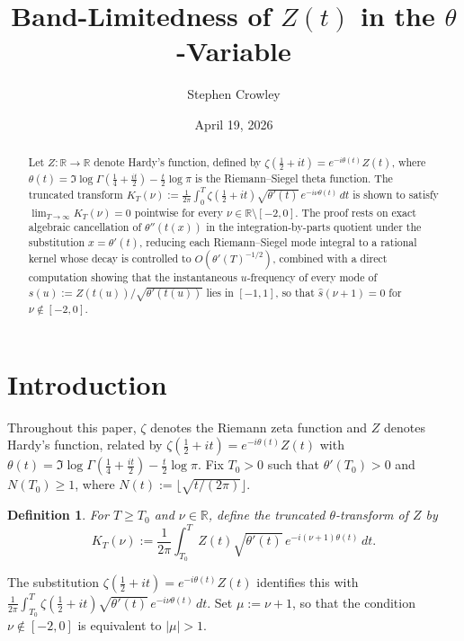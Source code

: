\documentclass[12pt]{article}
\title{Band-Limitedness of $Z(t)$ in the $\theta$-Variable}
\author{Stephen Crowley}
\date{April 19, 2026}
\newtheorem{definition}{Definition}
\begin{document}
\maketitle

\begin{abstract}
Let $Z:\mathbb{R}\to\mathbb{R}$ denote Hardy's function, defined by $\zeta(\tfrac{1}{2}+it) = e^{-i\theta(t)}Z(t)$, where $\theta(t) = \Im\log\Gamma\!\left(\tfrac{1}{4}+\tfrac{it}{2}\right) - \tfrac{t}{2}\log\pi$ is the Riemann--Siegel theta function. The truncated transform $K_T(\nu) := \frac{1}{2\pi}\int_{0}^{T}\zeta(\tfrac{1}{2}+it)\sqrt{\theta'(t)}\,e^{-i\nu\theta(t)}\,dt$ is shown to satisfy $\lim_{T\to\infty}K_T(\nu)=0$ pointwise for every $\nu\in\mathbb{R}\setminus[-2,0]$. The proof rests on exact algebraic cancellation of $\theta''(t(x))$ in the integration-by-parts quotient under the substitution $x=\theta'(t)$, reducing each Riemann--Siegel mode integral to a rational kernel whose decay is controlled to $O(\theta'(T)^{-1/2})$, combined with a direct computation showing that the instantaneous $u$-frequency of every mode of $s(u):=Z(t(u))/\sqrt{\theta'(t(u))}$ lies in $[-1,1]$, so that $\hat{s}(\nu+1)=0$ for $\nu\notin[-2,0]$.
\end{abstract}

\section{Introduction}

Throughout this paper, $\zeta$ denotes the Riemann zeta function and $Z$ denotes Hardy's function, related by $\zeta(\tfrac{1}{2}+it)=e^{-i\theta(t)}Z(t)$ with $\theta(t)=\Im\log\Gamma(\tfrac{1}{4}+\tfrac{it}{2})-\tfrac{t}{2}\log\pi$. Fix $T_0>0$ such that $\theta'(T_0)>0$ and $N(T_0)\ge 1$, where $N(t):=\lfloor\sqrt{t/(2\pi)}\rfloor$.

\begin{definition}
For $T\ge T_0$ and $\nu\in\mathbb{R}$, define the truncated $\theta$-transform of $Z$ by
\begin{equation}
K_T(\nu) := \frac{1}{2\pi}\int_{T_0}^{T} Z(t)\sqrt{\theta'(t)}\,e^{-i(\nu+1)\theta(t)}\,dt.
\end{equation}
\end{definition}

The substitution $\zeta(\tfrac{1}{2}+it)=e^{-i\theta(t)}Z(t)$ identifies this with $\frac{1}{2\pi}\int_{T_0}^{T}\zeta(\tfrac{1}{2}+it)\sqrt{\theta'(t)}\,e^{-i\nu\theta(t)}\,dt$. Set $\mu:=\nu+1$, so that the condition $\nu\notin[-2,0]$ is equivalent to $|\mu|>1$.
\end{document}
